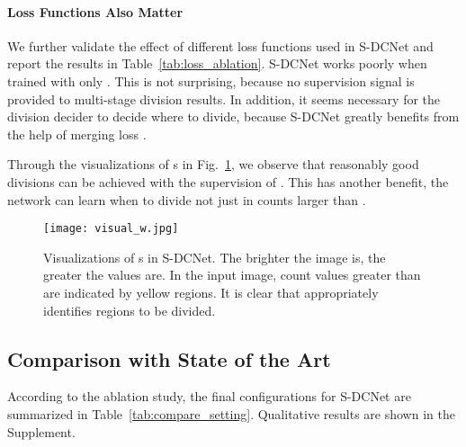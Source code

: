 \documentclass[10pt,twocolumn,letterpaper]{article}
\begin{document}
	\vspace{-10pt}
	\paragraph{Loss Functions Also Matter}
	We further validate the effect of different loss functions used in S-DCNet and report the results in Table~\ref{tab:loss_ablation}. S-DCNet works poorly when trained with only . This is not surprising, because no supervision signal is provided to multi-stage division results. In addition, it seems necessary for the division decider to decide where to divide, because S-DCNet greatly benefits from the help of merging loss .
	
	Through the visualizations of s in Fig.~\ref{fig:w_visual}, we observe that reasonably good divisions can be achieved with the supervision of . This has another benefit, the network can learn when to divide not just in counts larger than .
	
	\begin{figure}[!t]
		\begin{center}
\texttt{[image: visual\_w.jpg]}
		\end{center}
		\vspace{-10pt}
		\caption{Visualizations of s in S-DCNet. The brighter the image is, the greater the values are. In the input image, count values greater than  are indicated by yellow regions. It is clear that  appropriately identifies regions to be divided.}
		\label{fig:w_visual}
	\end{figure}
	
	
	


	
	\subsection{Comparison with State of the Art}
According to the ablation study, the final configurations for S-DCNet are summarized in Table~\ref{tab:compare_setting}. Qualitative results are shown in the Supplement.
	
\end{document}
